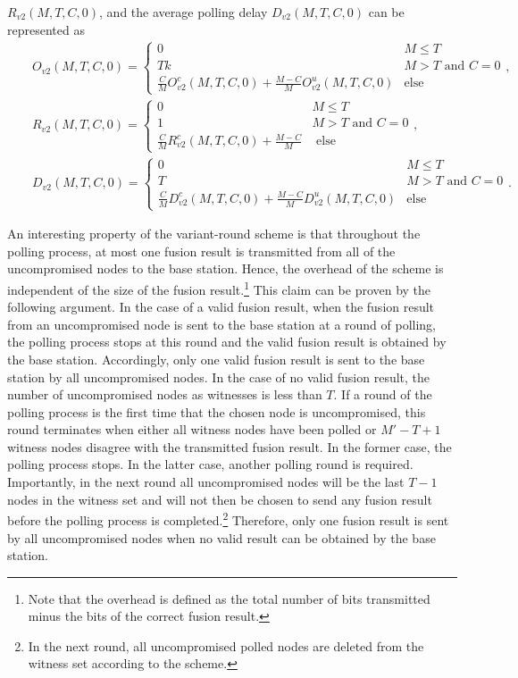 \documentclass[12pt, onecolumn, draftcls]{IEEEtran}
\begin{document}
$R_{v2}(M,T,C,0)$, and the average polling delay $D_{v2}(M,T,C,0)$
can be represented as
\begin{eqnarray*}
&&O_{v2}(M,T,C,0) = \left\{\begin{array}{ll} 0 & M \le T \\
Tk & M>T
\mbox{ and } C = 0 \\
\frac{C}{M}O_{v2}^c(M,T,C,0)+\frac{M-C}{M}O_{v2}^u(M,T,C,0) & \mbox{
else}
\end{array} \right. , \\
&&R_{v2}(M,T,C,0) = \left\{\begin{array}{ll} 0 & M \le T \\
1 & M>T
\mbox{ and } C = 0 \\
\frac{C}{M}R_{v2}^c(M,T,C,0)+\frac{M-C}{M} & \mbox{ else}
\end{array} \right. ,\\
&&D_{v2}(M,T,C,0) = \left\{\begin{array}{ll} 0 & M \le T \\
T & M>T
\mbox{ and } C = 0 \\
\frac{C}{M}D_{v2}^c(M,T,C,0)+\frac{M-C}{M}D_{v2}^u(M,T,C,0) & \mbox{
else}
\end{array} \right. .
\end{eqnarray*}

An interesting property of the variant-round scheme is that
throughout the polling process, at most one fusion result is
transmitted from all of the uncompromised nodes to the base station.
Hence, the overhead of the scheme is independent of the size of the
fusion result.\footnote{Note that the overhead is defined as the
total number of bits transmitted minus the bits of the correct
fusion result.} This claim can be proven by the following argument.
In the case of a valid fusion result, when the fusion result from an
uncompromised node is sent to the base station at a round of
polling, the polling process stops at this round and the valid
fusion result is obtained by the base station. Accordingly, only one
valid fusion result is sent to the base station by all uncompromised
nodes. In the case of no valid fusion result, the number of
uncompromised nodes as witnesses is less than $T$. If a round of the
polling process is the first time that the chosen node is
uncompromised, this round terminates when either all witness nodes
have been polled or $M'-T+1$ witness nodes disagree with the
transmitted fusion result. In the former case, the polling process
stops. In the latter case, another polling round is required.
Importantly, in the next round all uncompromised nodes will be the
last $T-1$ nodes in the witness set and will not then be chosen to
send any fusion result before the polling process is
completed.\footnote{In the next round, all uncompromised polled
nodes are deleted from the witness set according to the scheme.}
Therefore, only one fusion result is sent by all uncompromised nodes
when no valid result can be obtained by the base station.
\end{document}
